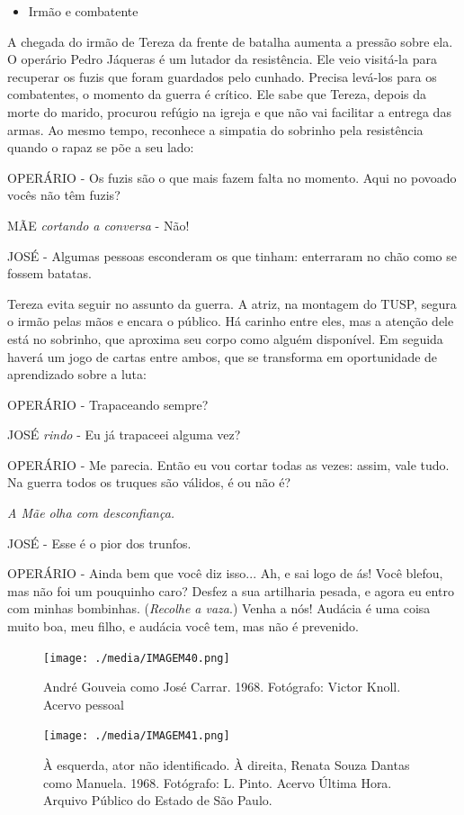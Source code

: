 \begin{itemize}
\item
  Irmão e combatente
\end{itemize}

A chegada do irmão de Tereza da frente de batalha aumenta a pressão
sobre ela. O operário Pedro Jáqueras é um lutador da resistência. Ele
veio visitá-la para recuperar os fuzis que foram guardados pelo cunhado.
Precisa levá-los para os combatentes, o momento da guerra é crítico. Ele
sabe que Tereza, depois da morte do marido, procurou refúgio na igreja e
que não vai facilitar a entrega das armas. Ao mesmo tempo, reconhece a
simpatia do sobrinho pela resistência quando o rapaz se põe a seu lado:

OPERÁRIO - Os fuzis são o que mais fazem falta no momento. Aqui no
povoado vocês não têm fuzis?

MÃE \textit{cortando a conversa} - Não!

JOSÉ - Algumas pessoas esconderam os que tinham: enterraram no chão como
se fossem batatas.

Tereza evita seguir no assunto da guerra. A atriz, na montagem do TUSP,
segura o irmão pelas mãos e encara o público. Há carinho entre eles, mas
a atenção dele está no sobrinho, que aproxima seu corpo como alguém
disponível. Em seguida haverá um jogo de cartas entre ambos, que se
transforma em oportunidade de aprendizado sobre a luta:

OPERÁRIO - Trapaceando sempre?

JOSÉ \textit{rindo} - Eu já trapaceei alguma vez?

OPERÁRIO - Me parecia. Então eu vou cortar todas as vezes: assim, vale
tudo. Na guerra todos os truques são válidos, é ou não é?

\textit{A Mãe olha com desconfiança.}

JOSÉ - Esse é o pior dos trunfos.

OPERÁRIO - Ainda bem que você diz isso... Ah, e sai logo de ás! Você
blefou, mas não foi um pouquinho caro? Desfez a sua artilharia pesada, e
agora eu entro com minhas bombinhas. (\textit{Recolhe a vaza}.) Venha a
nós! Audácia é uma coisa muito boa, meu filho, e audácia você tem, mas
não é prevenido.

\begin{figure}
\texttt{[image: ./media/IMAGEM40.png]}
\caption{André
Gouveia como José Carrar. 1968. Fotógrafo: Victor Knoll. Acervo pessoal}
\end{figure}

\begin{figure}
\texttt{[image: ./media/IMAGEM41.png]}
\caption{À esquerda, ator não identificado. À direita, Renata Souza Dantas como
Manuela. 1968. Fotógrafo: L. Pinto. Acervo Última Hora. Arquivo Público
do Estado de São Paulo.}
\end{figure}

